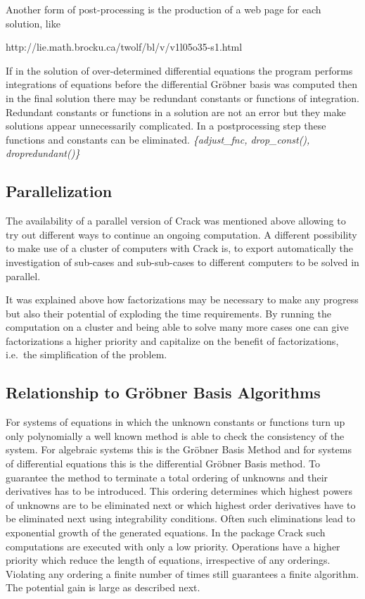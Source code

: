 \documentclass[12pt]{article}
\begin{document}
  Another form of post-processing is the production of
  a web page for each solution, like
           http://lie.math.brocku.ca/twolf/bl/v/v1l05o35-s1.html

  If in the solution of over-determined differential equations the
  program performs integrations of equations before the differential
  Gr\"{o}bner basis was computed then in the final solution there may
  be redundant constants or functions of integration.
  Redundant constants or functions in a solution are not an
  error but they make solutions appear unnecessarily complicated.
  In a postprocessing step these functions and constants can be eliminated.
  {\em \{adjust\_fnc, drop\_const(), dropredundant()\} }

\subsection{Parallelization}
  The availability of a parallel version of {\sc Crack} was mentioned
  above allowing to try out different ways to continue an ongoing
  computation. A different possibility to make use of a cluster of
  computers with {\sc Crack} is, to export automatically the
  investigation of sub-cases and sub-sub-cases to different computers
  to be solved in parallel.

  It was explained above how factorizations may be necessary to make
  any progress but also their potential of exploding the time requirements.
  By running the computation on a cluster and
  being able to solve many more cases one can give factorizations a
  higher priority and capitalize on the benefit of factorizations,
  i.e.\ the simplification of the problem.

\subsection{Relationship to Gr\"{o}bner Basis Algorithms}
  For systems of equations in which the unknown constants or functions
  turn up only polynomially a well known method is able to check the
  consistency of the system. For algebraic systems this is the
  Gr\"{o}bner Basis Method and for systems of differential equations
  this is the differential Gr\"{o}bner Basis method. To guarantee the
  method to terminate a total ordering of unknowns and their
  derivatives has to be introduced. This ordering determines which
  highest powers of unknowns are to be eliminated next or which
  highest order derivatives have to be eliminated next using integrability
  conditions. Often such eliminations lead to exponential growth of
  the generated equations. In the package {\sc Crack} such
  computations are executed with only a low priority. Operations have
  a higher priority which reduce the length of equations,
  irrespective of any orderings. Violating any ordering a finite
  number of times still guarantees a finite algorithm. The potential
  gain is large as described next.
\end{document}
